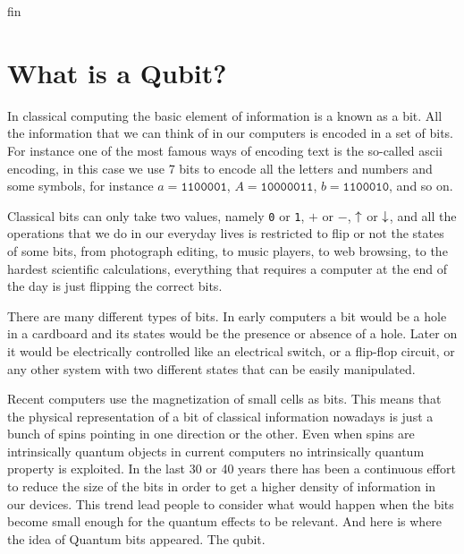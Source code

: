 fin
\section{What is a Qubit?}
In classical computing the basic element of information is a known as a bit. All the information that we can think of in our computers is encoded in a set of bits.
For instance one of the most famous ways of encoding text is the so-called \ac{ascii} encoding, in this case we use 7 bits to encode all the letters and numbers and some symbols, for instance $a=\texttt{1100001}$, $A=\texttt{10000011}$, $b=\texttt{1100010}$, and so on.

Classical bits can only take two values, namely \texttt{0} or \texttt{1}, $+$ or $-$, $\uparrow$ or $\downarrow$, and all the operations that we do in our everyday lives is restricted to flip or not the states of some bits, from photograph editing, to music players, to web browsing, to the hardest scientific calculations, everything that requires a computer at the end of the day is just flipping the correct bits.


There are many different types of bits. In early computers a bit would be a hole in a cardboard and its states would be the presence or absence of a hole. Later on it would be electrically controlled like an electrical switch, or a flip-flop circuit, or any other system with two different states that can be easily manipulated.

Recent computers use the magnetization of small cells as bits. This means that the physical representation of a bit of classical information nowadays is just a bunch of spins pointing in one direction or the other.
Even when spins are intrinsically quantum objects in current computers no intrinsically quantum property is exploited.
In the last 30 or 40 years there has been a continuous effort to reduce the size of the bits in order to get a higher density of information in our devices. This trend lead people to consider what would happen when the bits become small enough for the quantum effects to be relevant. And here is where the idea of Quantum bits appeared.
The qubit.


